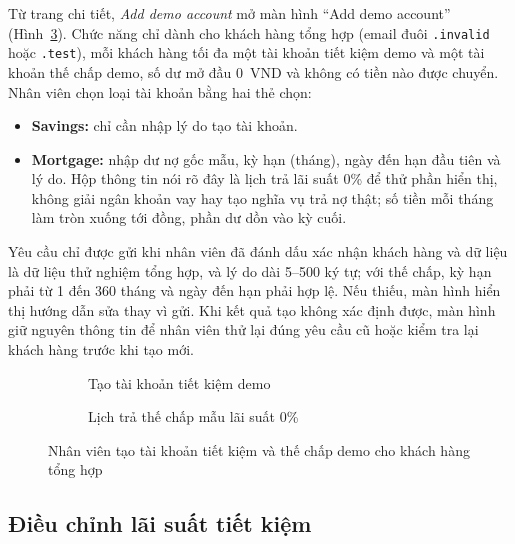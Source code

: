 Từ trang chi tiết, \textit{Add demo account} mở màn hình ``Add demo account'' (Hình~\ref{fig:ch4-demo-account}). Chức năng chỉ dành cho khách hàng tổng hợp (email đuôi \texttt{.\allowbreak{}invalid} hoặc \texttt{.\allowbreak{}test}), mỗi khách hàng tối đa một tài khoản tiết kiệm demo và một tài khoản thế chấp demo, số dư mở đầu 0~VND và không có tiền nào được chuyển. Nhân viên chọn loại tài khoản bằng hai thẻ chọn:
\begin{itemize}
  \item \textbf{Savings:} chỉ cần nhập lý do tạo tài khoản.
  \item \textbf{Mortgage:} nhập dư nợ gốc mẫu, kỳ hạn (tháng), ngày đến hạn đầu tiên và lý do. Hộp thông tin nói rõ đây là lịch trả lãi suất 0\% để thử phần hiển thị, không giải ngân khoản vay hay tạo nghĩa vụ trả nợ thật; số tiền mỗi tháng làm tròn xuống tới đồng, phần dư dồn vào kỳ cuối.
\end{itemize}
Yêu cầu chỉ được gửi khi nhân viên đã đánh dấu xác nhận khách hàng và dữ liệu là dữ liệu thử nghiệm tổng hợp, và lý do dài 5--500 ký tự; với thế chấp, kỳ hạn phải từ 1 đến 360 tháng và ngày đến hạn phải hợp lệ. Nếu thiếu, màn hình hiển thị hướng dẫn sửa thay vì gửi. Khi kết quả tạo không xác định được, màn hình giữ nguyên thông tin để nhân viên thử lại đúng yêu cầu cũ hoặc kiểm tra lại khách hàng trước khi tạo mới.

\begin{figure}[H]
\centering
\begin{subfigure}[t]{0.4\textwidth}
  \centering
  \caption{Tạo tài khoản tiết kiệm demo}
  \label{fig:ch4-demo-account-savings}
\end{subfigure}\hspace{0.05\textwidth}%
\begin{subfigure}[t]{0.4\textwidth}
  \centering
  \caption{Lịch trả thế chấp mẫu lãi suất 0\%}
  \label{fig:ch4-demo-account-mortgage}
\end{subfigure}
\caption{Nhân viên tạo tài khoản tiết kiệm và thế chấp demo cho khách hàng tổng hợp}
\label{fig:ch4-demo-account}
\end{figure}

\subsection{Điều chỉnh lãi suất tiết kiệm}
\label{sec:ch4-officer-rate}

